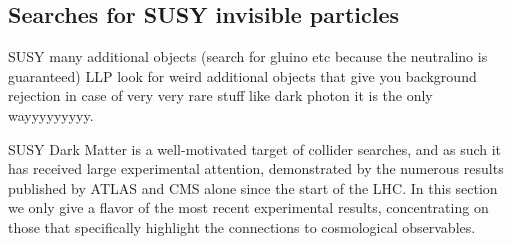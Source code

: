 


%

\subsection{Searches for SUSY invisible particles}
\label{sec:results_SUSYSearches}

SUSY many additional objects (search for gluino etc because the neutralino is guaranteed) 
LLP look for weird additional objects that give you background rejection in case of very very rare stuff like dark photon it is the only wayyyyyyyyy.

SUSY Dark Matter is a well-motivated target of collider searches, and as such it has received 
large experimental attention, demonstrated by the numerous results published by ATLAS and CMS alone since the start of the LHC.  
In this section we only give a flavor of the most recent experimental results, concentrating on those
that specifically highlight the connections to cosmological observables. 

